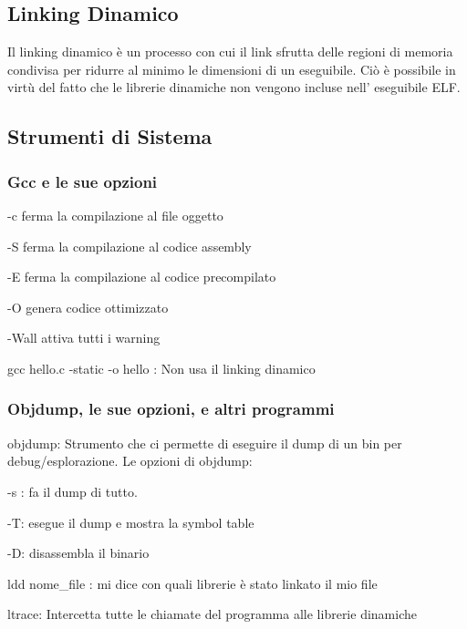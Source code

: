 \documentclass[a4paper,12pt]{article} %
\begin{document}
\subsection{Linking Dinamico}
Il linking dinamico è un processo con cui il link sfrutta delle regioni di memoria condivisa per ridurre al minimo le dimensioni di un eseguibile. Ciò è possibile in virtù del fatto che le librerie dinamiche non vengono incluse nell' eseguibile ELF.
\subsection{Strumenti di Sistema}
\subsubsection{Gcc e le sue opzioni}
\begin{description}
\item -c ferma la compilazione al file oggetto
\item -S ferma la compilazione al codice assembly
\item -E ferma la compilazione al codice precompilato
\item -O genera codice ottimizzato
\item -Wall attiva tutti i warning
\item 
\item gcc hello.c -static -o hello : Non usa il linking dinamico
\end{description}
\subsubsection{Objdump, le sue opzioni, e altri programmi}
\begin{description}
\item objdump: Strumento che ci permette di eseguire il dump di un bin per debug/esplorazione. Le opzioni di objdump:
	\begin{description}
	\item -s : fa il dump di tutto.
	\item -T: esegue il dump e mostra la symbol table
	\item -D: disassembla il binario
	\end{description}
\item ldd nome\_file : mi dice con quali librerie è stato linkato il mio file
\item ltrace: Intercetta tutte le chiamate del programma alle librerie dinamiche
\end{description}
\end{document}
